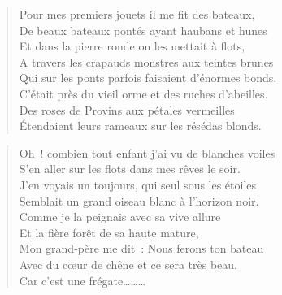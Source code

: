 \documentclass[french,twoside]{book} %
\newcommand{\astertri}{\medskip\par\centerline{\color{rubric}\large\selectfont{\syms ✻\,✻\,✻}}\medskip\par}%
\newenvironment{quoteblock}%
  {\begin{quoting}}
  {\end{quoting}}
\newenvironment{quotebar}{%
    \def\FrameCommand{{\color{rubric!10!}\vrule width 0.5em} \hspace{0.9em}}%
    \def\OuterFrameSep{\itemsep} %
    \MakeFramed {\advance\hsize-\width \FrameRestore}
  }%
  {%
    \endMakeFramed
  }
\renewenvironment{quoteblock}%
  {%
    \savenotes
    \setstretch{0.9}
    \normalfont
    \begin{quotebar}
  }
  {%
    \end{quotebar}
    \spewnotes
  }
\begin{document}
\begin{verse}
Pour mes premiers jouets il me fit des bateaux,\\
De beaux bateaux pontés ayant haubans et hunes\\
Et dans la pierre ronde on les mettait à flots,\\
A travers les crapauds monstres aux teintes brunes \\
Qui sur les ponts parfois faisaient d’énormes bonds.\\
C’était près du vieil orme et des ruches d’abeilles.\\
Des roses de Provins aux pétales vermeilles\\
Étendaient leurs rameaux sur les résédas blonds.\\
\end{verse}
\begin{quoteblock}

\astertri

 \end{quoteblock}

\begin{verse}
Oh ! combien tout enfant j’ai vu de blanches voiles\\
S’en aller sur les flots dans mes rêves le soir.\\
J’en voyais un toujours, qui seul sous les étoiles\\
Semblait un grand oiseau blanc à l’horizon noir.\\
Comme je la peignais avec sa vive allure\\
Et la fière forêt de sa haute mature,\\
Mon grand-père me dit : Nous ferons ton bateau\\
Avec du cœur de chêne et ce sera très beau.\\
Car c’est une frégate………\\
\end{verse}
\end{document}
